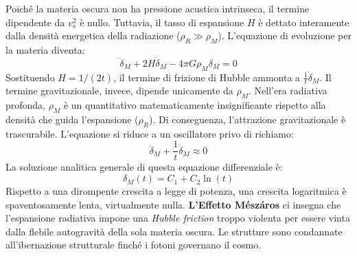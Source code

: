 \documentclass[11pt,a4paper]{report}
\begin{document}
Poiché la materia oscura non ha pressione acustica intrinseca, il termine dipendente da $v_s^2$ è nullo. Tuttavia, il tasso di espansione $H$ è dettato interamente dalla densità energetica della radiazione ($\rho_R \gg \rho_M$). L'equazione di evoluzione per la materia diventa:
\begin{equation}
\ddot{\delta}_M + 2H\dot{\delta}_M - 4\pi G \rho_M \delta_M = 0
\end{equation}
Sostituendo $H = 1/(2t)$, il termine di frizione di Hubble ammonta a $\frac{1}{t}\dot{\delta}_M$.
Il termine gravitazionale, invece, dipende unicamente da $\rho_M$. Nell'era radiativa profonda, $\rho_M$ è un quantitativo matematicamente insignificante rispetto alla densità che guida l'espansione ($\rho_R$). Di conseguenza, l'attrazione gravitazionale è trascurabile. L'equazione si riduce a un oscillatore privo di richiamo:
\begin{equation}
\ddot{\delta}_M + \frac{1}{t}\dot{\delta}_M \approx 0
\end{equation}
La soluzione analitica generale di questa equazione differenziale è:
\begin{equation}
\delta_M(t) = C_1 + C_2 \ln(t)
\end{equation}
Rispetto a una dirompente crescita a legge di potenza, una crescita logaritmica è spaventosamente lenta, virtualmente nulla. \textbf{L'Effetto Mészáros} ci insegna che l'espansione radiativa impone una \textit{Hubble friction} troppo violenta per essere vinta dalla flebile autogravità della sola materia oscura. Le strutture sono condannate all'ibernazione strutturale finché i fotoni governano il cosmo.
\end{document}
